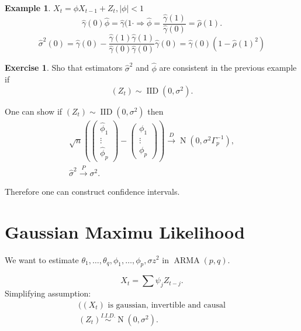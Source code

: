 \documentclass[12pt,a4paper, notitlepage]{book}
\theoremstyle{definition} %
\newtheorem{example}{Example}[chapter]
\newtheorem{exercise}{Exercise}[chapter]
\theoremstyle{plain} %
\DeclareMathOperator{\No}{N}
\DeclareMathOperator{\Iid}{IID}
\DeclareMathOperator{\Arma}{ARMA}
\begin{document}
\begin{example}
$ X_t = \phi X_{t-1} + Z_t, | \phi | < 1 $
\[ \hat{\gamma}(0)  \hat{\phi} = \hat{\gamma}(1· \Rightarrow \hat{\phi} = \frac{\hat{\gamma}(1)}{ \hat{\gamma}(0)} = \hat{\rho}(1) . \]
\[ \hat{ \sigma} ^2(0) = \hat{\gamma}(0)  - \frac{ \hat{\gamma}(1) \hat{\gamma}(1)}{\hat{\gamma}(0) \hat{\gamma}(0)} \hat{\gamma}(0) = \hat{\gamma}(0) ( 1 - \hat{\rho}(1)^2) \]
\end{example}


\begin{exercise}
Sho that estimators $ \hat{\sigma}^2 $ and $ \hat{\phi} $ are consistent in the previous example if 
\[ (Z_t) \sim \Iid(0, \sigma^2) . \]
\end{exercise}

One can show if $  (Z_t) \sim \Iid(0, \sigma ^2) $  then
\begin{align*} 
\sqrt{n} \left( \left( \begin{array} {c} \hat{\phi}_1 \\ \vdots \\ \hat{\phi} _p \end{array} \right) - \left( \begin{array}{c} \phi _1 \\ \vdots \\ \phi _p \end{array} \right) \right) \overset{D}{\rightarrow } \No(0, \sigma^2 \Gamma_p ^{-1} ) , \\
\hat{\sigma}^2 \overset{P}{\rightarrow} \sigma^2  .
\end{align*}

Therefore one can construct confidence intervals.


\section{Gaussian Maximu Likelihood}

We want to estimate $ \theta _1, \ldots , \theta _q, \phi _1, \ldots , \phi _p, \sigma z^2 $ in $ \Arma(p,q) $.

\[ X_t = \sum \psi _j Z_{t-j} . \]
Simplifying assumption:
\begin{align*}
 ((X_t) \text{ is gaussian, invertible and causal} \\
(Z_t) \overset{I.I.D.}{\sim} \No(0, \sigma^2) .
\end{align*}
\end{document}
